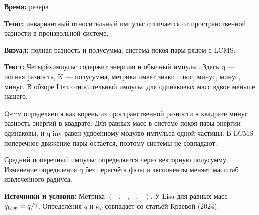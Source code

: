 \textbf{Время:} резерв

\textbf{Тезис:} инвариантный относительный импульс отличается от пространственной разности в произвольной системе.

\textbf{Визуал:} полная разность и полусумма; система покоя пары рядом с LCMS.

\textbf{Текст:} Четырёхимпульс содержит энергию и обычный импульс. Здесь q — полная разность, K — полусумма, метрика имеет знаки плюс, минус, минус, минус. В обзоре Lisa относительный импульс для одинаковых масс вдвое меньше нашего.

Q-inv определяется как корень из пространственной разности в квадрате минус разность энергий в квадрате. Для равных масс в системе покоя пары энергии одинаковы, и q-inv равен удвоенному модулю импульса одной частицы. В LCMS поперечное движение пары остаётся, поэтому системы не совпадают.

Средний поперечный импульс определяется через векторную полусумму. Изменение определения q без пересчёта фазы и экспоненты меняет масштаб извлечённого радиуса.

\textbf{Источники и условия:} Метрика \((+,-,-,-)\). У Lisa для равных масс \(q_{\rm Lisa}=q/2\). Определения \(q\) и \(k_T\) совпадает со статьёй Краевой (2024).
